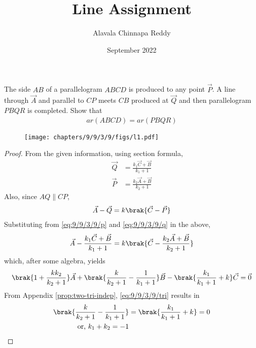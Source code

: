\documentclass[journal,10pt,twocolumn]{article}
\title{\textbf{Line Assignment}}
\author{Alavala Chinnapa Reddy}
\date{September 2022}
\begin{document}
\maketitle
\fi
 The side $AB$ of a parallelogram $ABCD$ is produced to any point $\vec{P}$. A line through $\vec{A}$ and parallel to $CP$ meets $CB$ produced at $\vec{Q}$ and then parallelogram $PBQR$ is completed. Show that
 \begin{align}
	 ar(ABCD) = ar(PBQR)
		\label{eq:9/9/3/9}
 \end{align}
	\begin{figure}[H]
		\centering
 \texttt{[image: chapters/9/9/3/9/figs/l1.pdf]}
		\caption{}
		\label{fig:9/9/3/9}
  	\end{figure}
	\begin{proof}
		From the given information, using section formula, 
  \begin{align}
		\label{eq:9/9/3/9/p}
	  \vec{Q}&= \frac{k_1\vec{C}+ \vec{B}}{k_1+1}
	  \\
	  \vec{P}&= \frac{k_2\vec{A}+ \vec{B}}{k_2+1}
		\label{eq:9/9/3/9/q}
  \end{align}
  Also, since $AQ \parallel CP$,
  \begin{align}
	  \vec{A}-\vec{Q}=k\brak{\vec{C}-\vec{P}}
  \end{align}
  Substituting from 
		\eqref{eq:9/9/3/9/p}
		and
		\eqref{eq:9/9/3/9/q}
		in the above, 
  \begin{align}
	  \vec{A}-\frac{k_1\vec{C}+ \vec{B}}{k_1+1}=k\brak{\vec{C}-\frac{k_2\vec{A}+ \vec{B}}{k_2+1}}
  \end{align}
  which, after some algebra, yields
  \begin{align}
		\label{eq:9/9/3/9/tri}
	  \brak{1 + \frac{kk_2}{k_2+1}}  \vec{A}+\brak{\frac{k}{k_2+1}-\frac{1}{k_1+1}}\vec{B}- \brak{\frac{k_1}{k_1+1}+k}\vec{C}=\vec{0}
  \end{align}
  From Appendix
	  \ref{prop:two-tri-indep},
		\eqref{eq:9/9/3/9/tri}
		results in
  \begin{align}
	  \brak{\frac{k}{k_2+1}-\frac{1}{k_1+1}} &=
	  \brak{\frac{k_1}{k_1+1}+k}= 0
	  \\
	  \text{or, } k_1 +k_2 = -1
		\label{eq:9/9/3/9/k1k2}
  \end{align}


\end{proof}
\end{document}
